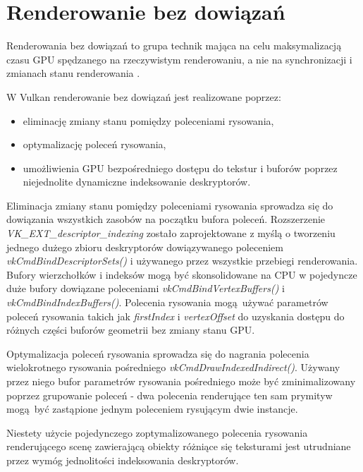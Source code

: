 \section{Renderowanie bez dowiązań}

Renderowania bez dowiązań to grupa technik mająca na celu maksymalizacją czasu GPU spędzanego na rzeczywistym renderowaniu, a nie na synchronizacji i zmianach stanu renderowania \cite{kosarevsky20213d}.

W Vulkan renderowanie bez dowiązań jest realizowane poprzez:
\begin{itemize}
	\item eliminację zmiany stanu pomiędzy poleceniami rysowania,
	\item optymalizację poleceń rysowania,
	\item umożliwienia GPU bezpośredniego dostępu do tekstur i buforów poprzez niejednolite dynamiczne indeksowanie deskryptorów.
\end{itemize}


Eliminacja zmiany stanu pomiędzy poleceniami rysowania sprowadza się do dowiązania wszystkich zasobów na początku bufora poleceń.
Rozszerzenie \textit{VK\_EXT\_descriptor\_indexing} zostało zaprojektowane z myślą o tworzeniu jednego dużego zbioru deskryptorów dowiązywanego poleceniem \textit{vkCmdBindDescriptorSets()} i używanego przez wszystkie przebiegi renderowania.
Bufory wierzchołków i indeksów mogą być skonsolidowane na CPU w pojedyncze duże bufory dowiązane poleceniami \textit{vkCmdBindVertexBuffers()} i \textit{vkCmdBindIndexBuffers()}.
Polecenia rysowania mogą używać parametrów poleceń rysowania takich jak \textit{firstIndex} i \textit{vertexOffset} do uzyskania dostępu do różnych części buforów geometrii bez zmiany stanu GPU.

Optymalizacja poleceń rysowania sprowadza się do nagrania polecenia wielokrotnego rysowania pośredniego \textit{vkCmdDrawIndexedIndirect()}. Używany przez niego bufor parametrów rysowania pośredniego może być zminimalizowany poprzez grupowanie poleceń - dwa polecenia renderujące ten sam prymityw mogą być zastąpione jednym poleceniem rysującym dwie instancje.

Niestety użycie pojedynczego zoptymalizowanego polecenia rysowania renderującego scenę zawierającą obiekty różniące się teksturami jest utrudniane przez wymóg jednolitości indeksowania deskryptorów.

